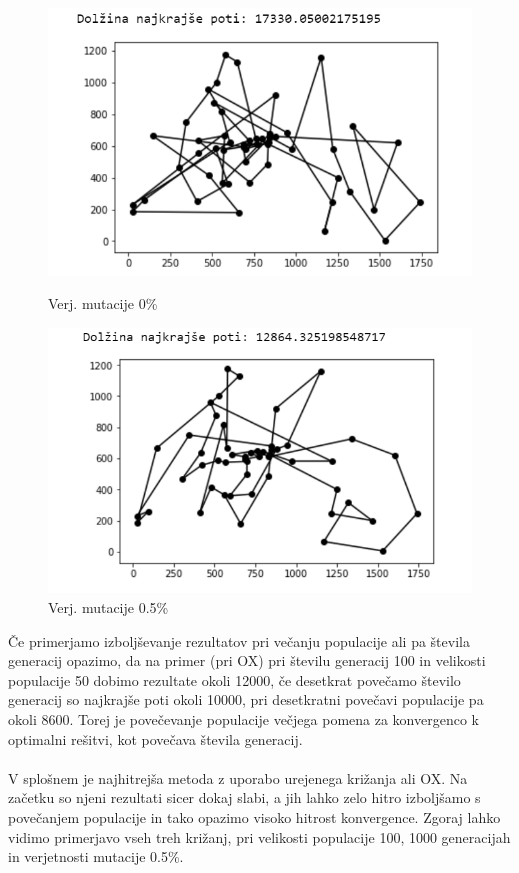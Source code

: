 \documentclass[12pt,a4paper]{amsart}
\theoremstyle{definition} %
\theoremstyle{plain} %
\begin{document}
\begin{figure}[h!]
\begin{minipage}[t]{0.48\textwidth}
\includegraphics[width=\linewidth,keepaspectratio=true]{primer-mut1}
\caption{Verj. mutacije 0\%}
\label{mut1}
\end{minipage}
\hspace*{\fill} %
\begin{minipage}[t]{0.48\textwidth}
\includegraphics[width=\linewidth,keepaspectratio=true]{primer-mut2}
\caption{Verj. mutacije 0.5\%}
\label{mut2}
\end{minipage}
\end{figure}
\newpage
Če primerjamo izboljševanje rezultatov pri večanju populacije ali pa števila generacij opazimo, da na primer (pri OX) pri številu generacij 100 in velikosti populacije 50 dobimo rezultate okoli 12000, če desetkrat povečamo število generacij so najkrajše poti okoli 10000, pri desetkratni povečavi populacije pa okoli 8600. Torej je povečevanje populacije večjega pomena za konvergenco k optimalni rešitvi, kot povečava števila generacij.
\\
\\
 V splošnem je najhitrejša metoda z uporabo urejenega križanja ali OX. Na začetku so njeni rezultati sicer dokaj slabi, a jih lahko zelo hitro izboljšamo s povečanjem populacije in tako opazimo visoko hitrost konvergence. 
Zgoraj lahko vidimo primerjavo vseh treh križanj, pri velikosti populacije 100, 1000 generacijah in verjetnosti mutacije 0.5\%.
\end{document}
